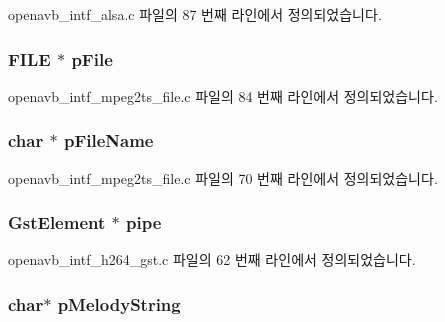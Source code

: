 openavb\+\_\+intf\+\_\+alsa.\+c 파일의 87 번째 라인에서 정의되었습니다.

\subsubsection[{\texorpdfstring{p\+File}{pFile}}]{\setlength{\rightskip}{0pt plus 5cm}F\+I\+LE $\ast$ p\+File}\hypertarget{structpvt__data__t_a5dcda7b55c4989de3c64d44e708672f1}{}\label{structpvt__data__t_a5dcda7b55c4989de3c64d44e708672f1}


openavb\+\_\+intf\+\_\+mpeg2ts\+\_\+file.\+c 파일의 84 번째 라인에서 정의되었습니다.

\subsubsection[{\texorpdfstring{p\+File\+Name}{pFileName}}]{\setlength{\rightskip}{0pt plus 5cm}char $\ast$ p\+File\+Name}\hypertarget{structpvt__data__t_aea3ef612729c0b5f248724edfeba8eb0}{}\label{structpvt__data__t_aea3ef612729c0b5f248724edfeba8eb0}


openavb\+\_\+intf\+\_\+mpeg2ts\+\_\+file.\+c 파일의 70 번째 라인에서 정의되었습니다.

\subsubsection[{\texorpdfstring{pipe}{pipe}}]{\setlength{\rightskip}{0pt plus 5cm}Gst\+Element $\ast$ pipe}\hypertarget{structpvt__data__t_a14ebdf8573bc2c62435241226711f72b}{}\label{structpvt__data__t_a14ebdf8573bc2c62435241226711f72b}


openavb\+\_\+intf\+\_\+h264\+\_\+gst.\+c 파일의 62 번째 라인에서 정의되었습니다.

\subsubsection[{\texorpdfstring{p\+Melody\+String}{pMelodyString}}]{\setlength{\rightskip}{0pt plus 5cm}char$\ast$ p\+Melody\+String}\hypertarget{structpvt__data__t_a304e613c569011f1202e4a95ae5f5372}{}\label{structpvt__data__t_a304e613c569011f1202e4a95ae5f5372}


